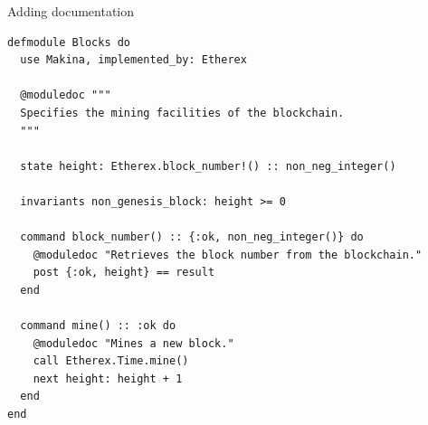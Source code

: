 \documentclass[aspectratio=169, 10pt]{beamer}
\begin{document}
\begin{frame}[label={sec:org3bed62d},fragile]{Adding documentation}
 \lstset{language=elixir,label= ,caption= ,captionpos=b,numbers=none,style=display}
\begin{lstlisting}
defmodule Blocks do
  use Makina, implemented_by: Etherex

  @moduledoc """
  Specifies the mining facilities of the blockchain.
  """

  state height: Etherex.block_number!() :: non_neg_integer()

  invariants non_genesis_block: height >= 0

  command block_number() :: {:ok, non_neg_integer()} do
    @moduledoc "Retrieves the block number from the blockchain."
    post {:ok, height} == result
  end

  command mine() :: :ok do
    @moduledoc "Mines a new block."
    call Etherex.Time.mine()
    next height: height + 1
  end
end
\end{lstlisting}
\end{frame}
\end{document}
